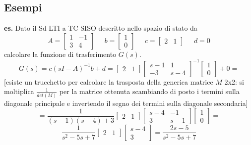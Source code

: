 \subsection{Esempi}
\textbf{es.}  Dato il Sd LTI a TC SISO descritto nello spazio di stato da 
\[
    A=\left[\begin{matrix}
        1 & -1\\
        3 & 4
    \end{matrix}\right] \;\;\;\;\; b = \left[\begin{matrix}
        1\\0
    \end{matrix}\right] \;\;\;\;\; c= \left[\begin{matrix}
        2 &1
    \end{matrix}\right] \;\;\;\;\;d=0
\]
calcolare la funzione di trasferimento $G(s)$.
\[
    G(s) = c (sI-A)^{-1} b +d = \left[\begin{matrix}
        2 &1
    \end{matrix}\right]\left[\begin{matrix}
        s-1&1\\
        -3 & s-4
    \end{matrix}\right]^{-1} \left[\begin{matrix}
        1\\0
    \end{matrix}\right]+0 = 
\]
[esiste un trucchetto per calcolare la trasposta della generica matrice $M$ 2x2: si moltiplica $\frac{1}{det(M)}$ per la matrice ottenuta scambiando di posto i termini sulla diagonale principale e invertendo il segno dei termini sulla diagonale secondaria]
\[
    = \frac{1}{(s-1)(s-4) +3} \left[\begin{matrix}
        2&1
    \end{matrix}\right]\left[\begin{matrix}
        s-4 & -1\\
        3 & s-1
    \end{matrix}\right]\left[\begin{matrix}
        1\\0
    \end{matrix}\right]=
\]
\[
    \frac{1}{s^2 -5s +7} \left[\begin{matrix}
        2&1
    \end{matrix}\right]\left[\begin{matrix}
        s-4\\3
    \end{matrix}\right] = \frac{2s -5 }{s^2 -5s +7}
\]